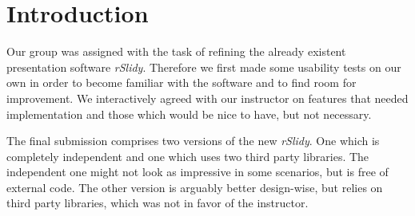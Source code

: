 %
%
% 
% 
% 


\chapter{Introduction}

\label{chap:Intro}

Our group was assigned with the task of refining the already existent presentation software \textit{rSlidy}. Therefore we first made some usability tests on our own in order to become familiar with the software and to find room for improvement. We interactively agreed with our instructor on features that needed implementation and those which would be nice to have, but not necessary.

The final submission comprises two versions of the new \textit{rSlidy}. One which is completely independent and one which uses two third party libraries. The independent one might not look as impressive in some scenarios, but is free of external code. The other version is arguably better design-wise, but relies on third party libraries, which was not in favor of the instructor. 

